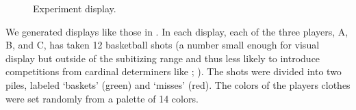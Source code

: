 \documentclass[leqno,12pt]{article}
\begin{document}
\begin{figure}[t]
  \centering
  \caption{Experiment display.}
  \label{fig:exp1}
\end{figure}

We generated displays like those in . In each
display, each of the three players, A, B, and C, has taken 12
basketball shots (a number small enough for visual display but outside
of the subitizing range and thus less likely to introduce competitions
from cardinal determiners like ;
\citealt{Degen:Tanenhaus:2014}). The shots were divided into two
piles, labeled `baskets' (green) and `misses' (red).  The colors of
the players clothes were set randomly from a palette of 14 colors.
\end{document}
